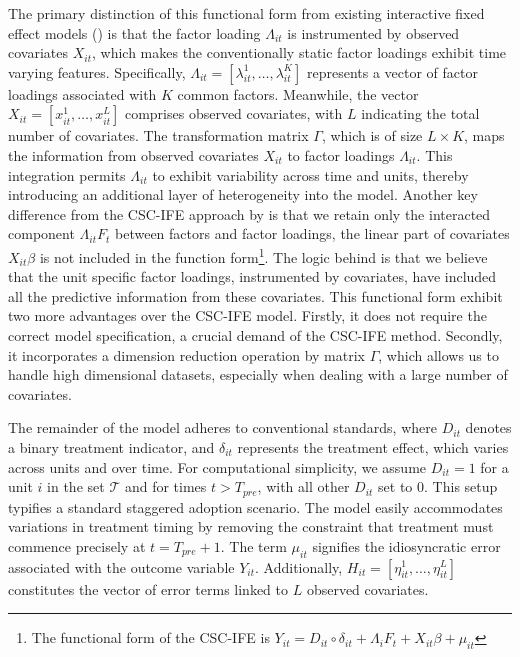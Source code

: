 \documentclass[12pt]{article}
\begin{document}
The primary distinction of this functional form from existing interactive fixed effect models (\cite{gobillon2016regional, chan2016policy}) is that the factor loading $\Lambda_{it}$ is instrumented by observed covariates $X_{it}$, which makes the conventionally static factor loadings exhibit time varying features. Specifically, $\Lambda_{it} = [\lambda_{it}^1, \ldots, \lambda_{it}^K]$ represents a vector of factor loadings associated with $K$ common factors. Meanwhile, the vector $X_{it} = [x_{it}^1, \ldots, x_{it}^L]$ comprises observed covariates, with $L$ indicating the total number of covariates. The transformation matrix $\Gamma$, which is of size $L \times K$, maps the information from observed covariates $X_{it}$ to factor loadings $\Lambda_{it}$. This integration permits $\Lambda_{it}$ to exhibit variability across time and units, thereby introducing an additional layer of heterogeneity into the model. Another key difference from the CSC-IFE approach by \cite{xu2017generalized} is that we retain only the interacted component $\Lambda_{it} F_t$ between factors and factor loadings, the linear part of covariates $X_{it}\beta$ is not included in the function form\footnote{The functional form of the CSC-IFE is $Y_{it} = D_{it} \circ \delta_{it} + \Lambda_{i}F_{t} + X_{it}\beta + \mu_{it}$}. The logic behind is that we believe that the unit specific factor loadings, instrumented by covariates, have included all the predictive information from these covariates. This functional form exhibit two more advantages over the CSC-IFE model. Firstly, it does not require the correct model specification, a crucial demand of the CSC-IFE method. Secondly, it incorporates a dimension reduction operation by matrix $\Gamma$, which allows us to handle high dimensional datasets, especially when dealing with a large number of covariates. 

The remainder of the model adheres to conventional standards, where $D_{it}$ denotes a binary treatment indicator, and $\delta_{it}$ represents the treatment effect, which varies across units and over time. For computational simplicity, we assume $D_{it} = 1$ for a unit $i$ in the set $\mathcal{T}$ and for times $t > T_{pre}$, with all other $D_{it}$ set to $0$. This setup typifies a standard staggered adoption scenario. The model easily accommodates variations in treatment timing by removing the constraint that treatment must commence precisely at $t = T_{pre} + 1$. The term $\mu_{it}$ signifies the idiosyncratic error associated with the outcome variable $Y_{it}$. Additionally, $H_{it} = [\eta_{it}^1, \ldots, \eta_{it}^L]$ constitutes the vector of error terms linked to $L$ observed covariates.
\end{document}
